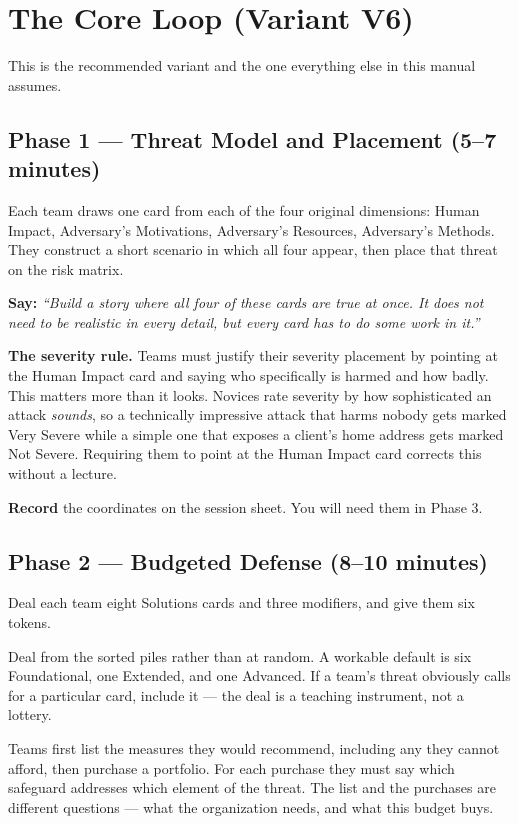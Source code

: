 \documentclass[11pt,letterpaper]{article}
\newcommand{\say}[1]{\textit{``#1''}}
\begin{document}
\section{The Core Loop (Variant V6)}

This is the recommended variant and the one everything else in this manual
assumes.

\subsection{Phase 1 --- Threat Model and Placement (5--7 minutes)}

Each team draws one card from each of the four original dimensions: Human
Impact, Adversary's Motivations, Adversary's Resources, Adversary's Methods.
They construct a short scenario in which all four appear, then place that threat
on the risk matrix.

\textbf{Say:} \say{Build a story where all four of these cards are true at once.
It does not need to be realistic in every detail, but every card has to do some
work in it.}

\textbf{The severity rule.} Teams must justify their severity placement by
pointing at the Human Impact card and saying who specifically is harmed and how
badly. This matters more than it looks. Novices rate severity by how
sophisticated an attack \emph{sounds}, so a technically impressive attack that
harms nobody gets marked Very Severe while a simple one that exposes a client's
home address gets marked Not Severe. Requiring them to point at the Human Impact
card corrects this without a lecture.

\textbf{Record} the coordinates on the session sheet. You will need them in
Phase 3.

\subsection{Phase 2 --- Budgeted Defense (8--10 minutes)}

Deal each team eight Solutions cards and three modifiers, and give them six
tokens.

Deal from the sorted piles rather than at random. A workable default is six
Foundational, one Extended, and one Advanced. If a team's threat obviously calls
for a particular card, include it --- the deal is a teaching instrument, not a
lottery.

Teams first list the measures they would recommend, including any they cannot
afford, then purchase a portfolio. For each purchase they must say which
safeguard addresses which element of the threat. The list and the purchases are
different questions --- what the organization needs, and what this budget buys.
\end{document}

